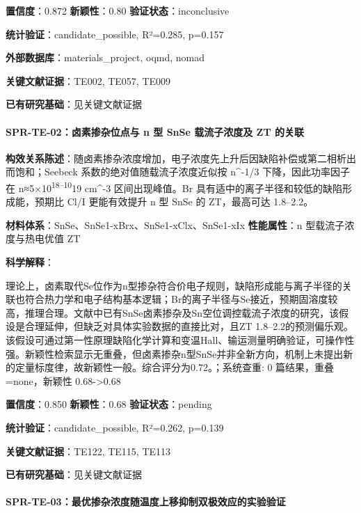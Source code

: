 \documentclass[12pt,a4paper]{ctexart}
\begin{document}
\textbf{置信度}：0.872 \textbar{} \textbf{新颖性}：0.80 \textbar{} \textbf{验证状态}：inconclusive

\textbf{统计验证}：candidate\_possible, R²=0.285, p=0.157

\textbf{外部数据库}：materials\_project, oqmd, nomad

\textbf{关键文献证据}：TE002, TE057, TE009

\textbf{已有研究基础}：见关键文献证据

\paragraph{SPR-TE-02：卤素掺杂位点与 n 型 SnSe 载流子浓度及 ZT 的关联}\label{spr-te-02ux5364ux7d20ux63baux6742ux4f4dux70b9ux4e0e-n-ux578b-snse-ux8f7dux6d41ux5b50ux6d53ux5ea6ux53ca-zt-ux7684ux5173ux8054}

\textbf{构效关系陈述}：随卤素掺杂浓度增加，电子浓度先上升后因缺陷补偿或第二相析出而饱和；Seebeck 系数的绝对值随载流子浓度近似按 n\^{}-1/3 下降，因此功率因子在 n≈5×10\textsuperscript{18--10}19 cm\^{}-3 区间出现峰值。Br 具有适中的离子半径和较低的缺陷形成能，预期比 Cl/I 更能有效提升 n 型 SnSe 的 ZT，最高可达 1.8--2.2。

\textbf{材料体系}：SnSe、SnSe1-xBrx、SnSe1-xClx、SnSe1-xIx \textbar{} \textbf{性能属性}：n 型载流子浓度与热电优值 ZT

\textbf{科学解释}：

理论上，卤素取代Se位作为n型掺杂符合价电子规则，缺陷形成能与离子半径的关联也符合热力学和电子结构基本逻辑；Br的离子半径与Se接近，预期固溶度较高，推理合理。文献中已有SnSe卤素掺杂及Sn空位调控载流子浓度的研究，该假设是合理延伸，但缺乏对具体实验数据的直接比对，且ZT 1.8--2.2的预测偏乐观。该假设可通过第一性原理缺陷化学计算和变温Hall、输运测量明确验证，可操作性强。新颖性检索显示无重叠，但卤素掺杂n型SnSe并非全新方向，机制上未提出新的定量标度律，故新颖性一般。综合评分为0.72。；系统查重: 0 篇结果，重叠=none，新颖性 0.68-\textgreater0.68

\textbf{置信度}：0.850 \textbar{} \textbf{新颖性}：0.68 \textbar{} \textbf{验证状态}：pending

\textbf{统计验证}：candidate\_possible, R²=0.262, p=0.139

\textbf{关键文献证据}：TE122, TE115, TE113

\textbf{已有研究基础}：见关键文献证据

\paragraph{SPR-TE-03：最优掺杂浓度随温度上移抑制双极效应的实验验证}\label{spr-te-03ux6700ux4f18ux63baux6742ux6d53ux5ea6ux968fux6e29ux5ea6ux4e0aux79fbux6291ux5236ux53ccux6781ux6548ux5e94ux7684ux5b9eux9a8cux9a8cux8bc1}
\end{document}
